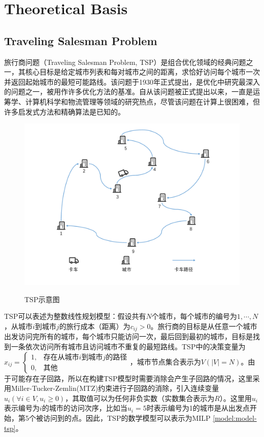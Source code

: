 \chapter{Theoretical Basis}

\section{Traveling Salesman Problem}
旅行商问题（Traveling Salesman Problem, TSP）是组合优化领域的经典问题之一，其核心目标是给定城市列表和每对城市之间的距离，求恰好访问每个城市一次并返回起始城市的最短可能路线。该问题于1930年正式提出，是优化中研究最深入的问题之一，被用作许多优化方法的基准。自从该问题被正式提出以来，一直是运筹学、计算机科学和物流管理等领域的研究热点，尽管该问题在计算上很困难，但许多启发式方法和精确算法是已知的\cite{2009A, 2012Models}。

\begin{figure}[!htb]
    \centering
    \includegraphics[width=\linewidth]{images/TSP.pdf}\\
    \caption{TSP示意图}
\end{figure}

TSP可以表述为整数线性规划模型\cite{papadimitriou1998combinatorial}：假设共有$N$个城市，每个城市的编号为$1,\cdots,N$，从城市$i$到城市$j$的旅行成本（距离）为$c_{ij}>0$。旅行商的目标是从任意一个城市出发访问完所有的城市，每个城市只能访问一次，最后回到最初的城市，目标是找到一条依次访问所有城市且访问城市不重复的最短路线。TSP中的决策变量为$x_{ij}=\begin{cases}1, & \text{存在从城市$i$到城市$j$的路径}\\0, & \text{其他} \end{cases}$，城市节点集合表示为$V(|V| = N)$。由于可能存在子回路，所以在构建TSP模型时需要消除会产生子回路的情况，这里采用Miller-Tucker-Zemlin(MTZ)约束进行子回路的消除\cite{1960Integer}，引入连续变量$u_i(\forall i \in V, u_i \geq 0)$，其取值可以为任何非负实数（实数集合表示为$R$）。这里用$u_i$表示编号为$i$的城市的访问次序，比如当$u_i = 5$时表示编号为1的城市是从出发点开始，第5个被访问到的点。因此，TSP的数学模型可以表示为MILP \ref{model:model-tsp}。

